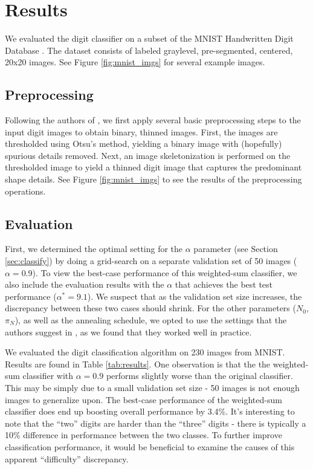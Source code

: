 \documentclass[oribibl]{llncs}
\begin{document}
\section{Results}

We evaluated the digit classifier on a subset of the MNIST Handwritten Digit Database \cite{mnist}.
The dataset consists of labeled graylevel, pre-segmented, centered, 20x20 images.
See Figure \ref{fig:mnist_imgs} for several example images.

\subsection{Preprocessing}
\label{sec:preproc}

Following the authors of \cite{Hinton92adaptiveelastic}, we first apply several basic preprocessing steps to the input digit images to obtain binary, thinned images.
First, the images are thresholded using Otsu's method, yielding a binary image with (hopefully) spurious details removed.
Next, an image skeletonization is performed on the thresholded image to yield a thinned digit image that captures the predominant shape details.
See Figure \ref{fig:mnist_imgs} to see the results of the preprocessing operations.

\subsection{Evaluation}

First, we determined the optimal setting for the $\alpha$ parameter (see Section \ref{sec:classify}) by doing a grid-search on a separate validation set of 50 images ($\alpha = 0.9$).
To view the best-case performance of this weighted-sum classifier, we also include the evaluation results with the $\alpha$ that achieves the best test performance ($\alpha^{*} = 9.1$).
We suspect that as the validation set size increases, the discrepancy between these two cases should shrink.
For the other parameters ($N_0$, $\pi_N$), as well as the annealing schedule, we opted to use the settings that the authors suggest in \cite{Hinton92adaptiveelastic}, as we found that they worked well in practice.

We evaluated the digit classification algorithm on 230 images from MNIST.
Results are found in Table \ref{tab:results}.
One observation is that the the weighted-sum classifier with $\alpha=0.9$ performs slightly worse than the original classifier.
This may be simply due to a small validation set size - 50 images is not enough images to generalize upon.
The best-case performance of the weighted-sum classifier does end up boosting overall performance by 3.4\%.
It's interesting to note that the ``two'' digits are harder than the ``three'' digits - there is typically a 10\% difference in performance between the two classes.
To further improve classification performance, it would be beneficial to examine the causes of this apparent ``difficulty'' discrepancy.
\end{document}
